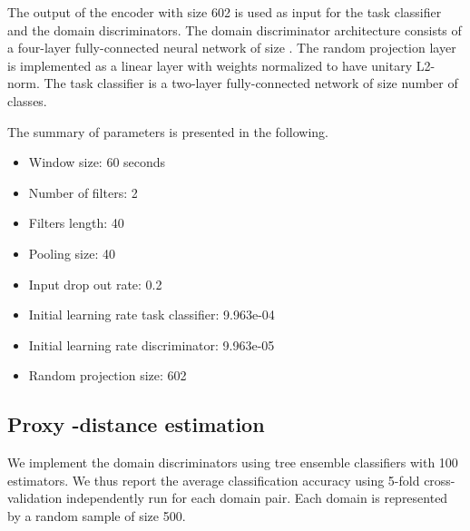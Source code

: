 \documentclass{article}
\begin{document}
The output of the encoder with size 602 is used as input for the task classifier and the domain discriminators. The domain discriminator architecture consists of a four-layer fully-connected neural network of size . The random projection layer is implemented as a linear layer with weights normalized to have unitary L2-norm. The task classifier is a two-layer fully-connected network of size  number of classes.

The summary of parameters is presented in the following.
\begin{itemize}
    \item Window size: 60 seconds 
    \item Number of filters: 2 
    \item Filters length: 40
    \item Pooling  size: 40 
    \item Input drop out rate: 0.2 
    \item Initial learning rate task classifier: 9.963e-04
    \item Initial learning rate discriminator: 9.963e-05
    \item Random projection size: 602
\end{itemize}

\subsection{Proxy -distance estimation}
We implement the domain discriminators using tree ensemble classifiers with 100 estimators. We thus report the average classification accuracy using 5-fold cross-validation independently run for each domain pair.  Each domain is represented by a random sample of size 500.
\end{document}
